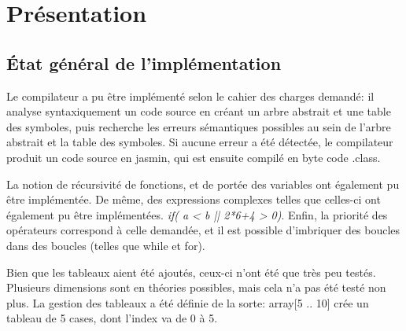 \documentclass[11pt,a4paper]{article}
\title{\vartitle}
\author{\varauthor}
\date{\vardate}
\begin{document}
  \begin{titlepage}
    \maketitle

    \thispagestyle{empty}

    \begin{abstract}
    Ce rapport décrit l'implémentation d'un compilateur du langage Hepial, défini les spécifications en annexe.
    \end{abstract}


    \tableofcontents

  \end{titlepage}

  \newpage

  \section{Présentation}
  
  \subsection{État général de l'implémentation}  
  
    \par Le compilateur a pu être implémenté selon le cahier des charges demandé: il analyse syntaxiquement un code source en créant un arbre abstrait et une table des symboles, puis recherche les erreurs sémantiques possibles au sein de l'arbre abstrait et la table des symboles. Si aucune erreur a été détectée, le compilateur produit un code source en jasmin, qui est ensuite compilé en byte code .class. 
    
     \par La notion de récursivité de fonctions, et de portée des variables ont également pu être implémentée. De même, des expressions complexes telles que celles-ci ont également pu être implémentées. \textit{if( a < b || 2*6+4 > 0)}. Enfin, la priorité des opérateurs correspond à celle demandée, et il est possible d'imbriquer des boucles dans des boucles (telles que while et for).
     
     \par Bien que les tableaux aient été ajoutés, ceux-ci n'ont été que très peu testés. Plusieurs dimensions sont en théories possibles, mais cela n'a pas été testé non plus. La gestion des tableaux a été définie de la sorte: array[5 .. 10] crée un tableau de 5 cases, dont l'index va de 0 à 5. 
     
\end{document}
